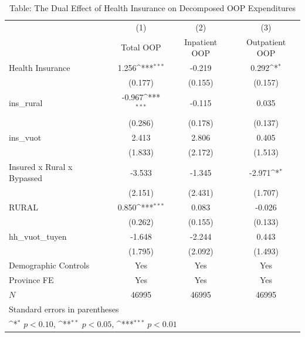 \begin{table}[htbp]\centering
\def\sym#1{\ifmmode^{#1}\else\(^{#1}\)\fi}
\caption{Table: The Dual Effect of Health Insurance on Decomposed OOP Expenditures}
\begin{tabular}{l*{3}{c}}
\hline\hline
            &\multicolumn{1}{c}{(1)}&\multicolumn{1}{c}{(2)}&\multicolumn{1}{c}{(3)}\\
            &\multicolumn{1}{c}{Total OOP}&\multicolumn{1}{c}{Inpatient OOP}&\multicolumn{1}{c}{Outpatient OOP}\\
\hline
Health Insurance&       1.256\sym{***}&      -0.219         &       0.292\sym{*}  \\
            &     (0.177)         &     (0.155)         &     (0.157)         \\
[1em]
ins\_rural   &      -0.967\sym{***}&      -0.115         &       0.035         \\
            &     (0.286)         &     (0.178)         &     (0.137)         \\
[1em]
ins\_vuot    &       2.413         &       2.806         &       0.405         \\
            &     (1.833)         &     (2.172)         &     (1.513)         \\
[1em]
Insured x Rural x Bypassed&      -3.533         &      -1.345         &      -2.971\sym{*}  \\
            &     (2.151)         &     (2.431)         &     (1.707)         \\
[1em]
RURAL       &       0.850\sym{***}&       0.083         &      -0.026         \\
            &     (0.262)         &     (0.155)         &     (0.133)         \\
[1em]
hh\_vuot\_tuyen&      -1.648         &      -2.244         &       0.443         \\
            &     (1.795)         &     (2.092)         &     (1.493)         \\
[1em]
Demographic Controls &         Yes         &         Yes         &         Yes         \\
[1em]
Province FE &         Yes         &         Yes         &         Yes         \\
\hline
\(N\)       &       46995         &       46995         &       46995         \\
\hline\hline
\multicolumn{4}{l}{\footnotesize Standard errors in parentheses}\\
\multicolumn{4}{l}{\footnotesize \sym{*} \(p<0.10\), \sym{**} \(p<0.05\), \sym{***} \(p<0.01\)}\\
\end{tabular}
\end{table}
